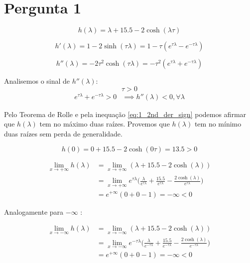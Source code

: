 \documentclass[a4paper, 18pt]{article}
\begin{document}


\section{Pergunta 1}
	\begin{equation} \label{init}
		h(\lambda) = \lambda + 15.5 - 2\cosh(\lambda\tau)
	\end{equation}

	$$h'(\lambda) = 1 - 2\sinh(\tau\lambda) = 1 - \tau(e^{\tau\lambda} - e^{-\tau\lambda})$$

	$$h''(\lambda) = -2\tau^2\cosh(\tau\lambda) = -\tau^2(e^{\tau\lambda} + e^{-\tau\lambda})$$

	\par
	Analisemos o sinal de $h''(\lambda)$:
	$$\tau > 0$$
	\begin{equation} \label{eq:1_2nd_der_sign}
	\begin{split}
		e^{\tau\lambda} + e^{-\tau\lambda} > 0 &\implies h''(\lambda) < 0, \forall \lambda
	\end{split}
	\end{equation}

	\par
	Pelo Teorema de Rolle e pela inequação \eqref{eq:1_2nd_der_sign} podemos afirmar que
	$h(\lambda)$ tem no máximo duas raízes. Provemos que $h(\lambda)$ tem no mínimo duas raízes sem perda de generalidade.

	$$h(0) = 0 + 15.5 - 2\cosh(0\tau) = 13.5 > 0$$

	\begin{align*}
		\lim_{x \to +\infty} h(\lambda)
		&= \lim_{x \to +\infty} (\lambda + 15.5 - 2\cosh(\lambda)) \\
		&= \lim_{x \to +\infty} e^{\tau\lambda} \bigg(\frac{\lambda}{e^{\tau\lambda}} + \frac{15.5}{e^{\tau\lambda}} - \frac{2\cosh(\lambda)}{e^{\tau\lambda}}\bigg) \\
		&= e^{+\infty} (0 + 0 - 1) = -\infty < 0
	\end{align*}

	\par
	Analogamente para  $-\infty$ :

	\begin{align*}
		\lim_{x \to -\infty} h(\lambda)
		&= \lim_{x \to -\infty} (\lambda + 15.5 - 2\cosh(\lambda)) \\
		&= \lim_{x \to -\infty} e^{-\tau\lambda} \bigg(\frac{\lambda}{e^{-\tau\lambda}} + \frac{15.5}{e^{-\tau\lambda}} - \frac{2\cosh(\lambda)}{e^{-\tau\lambda}}\bigg) \\
		&= e^{+\infty} (0 + 0 - 1) = -\infty < 0
	\end{align*}
\end{document}
